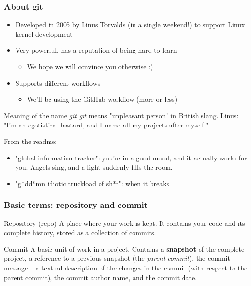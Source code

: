 \begin{frame}

\frametitle{About git}
	
\begin{itemize}
	\item Developed in 2005 by Linus Torvalds (in a single weekend!) to support Linux kernel development
	\item Very powerful, has a reputation of being hard to learn
	\begin{itemize}
	\item We hope we will convince you otherwise :)
	\end{itemize}
	\item Supports different workflows
	\begin{itemize}
	\item We'll be using the GitHub workflow (more or less)	
	\end{itemize}
\end{itemize}

\begin{block}{Meaning of the name \emph{git}}
\small
\emph{git} means "unpleasant person" in British slang. Linus: "I'm an egotistical bastard, and I name all my projects after myself."

\medskip
From the readme:
	 \begin{itemize}
	 \item "global information tracker": you're in a good mood, and it actually works for you. Angels sing, and a light suddenly fills the room.
	 \item "g*dd*mn idiotic truckload of sh*t": when it breaks
	 \end{itemize}
	 
\end{block}

\end{frame}


\begin{frame}

\frametitle{Basic terms: repository and commit}
\begin{block}{Repository (repo)}
	A place where your work is kept. It contains your code and its complete history, stored as a collection of commits.
\end{block}

\begin{block}{Commit}
	A basic unit of work in a project. Contains a \textbf{snapshot} of the complete project, a reference to a previous snapshot (the \textit{parent commit}), the commit message -- a textual description of the changes in the commit (with respect to the parent commit), the commit author name, and the commit date.
\end{block}	
\end{frame}

